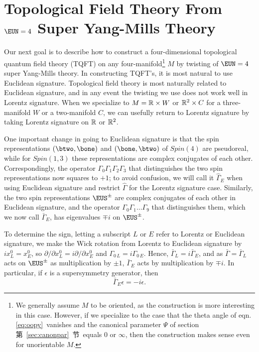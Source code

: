 
\section{Topological Field Theory From ${\EUN}=4$ Super
Yang-Mills Theory} \label{sec:tqftfour}

Our next goal is to describe how to construct a four-dimensional
topological quantum field theory (TQFT) on any
four-manifold\footnote{We generally assume $M$ to be oriented, as the
construction is more interesting in this case.  However, if we
specialize to the case that the theta angle of eqn. \eqref{eq:oopy}\
vanishes and the canonical parameter $\Psi$ of section 第~\ref{sec:canonpar}~节\
equals 0 or $\infty$, then the construction makes sense even for
unorientable $M$.} $M$ by twisting of ${\EUN}=4$ super Yang-Mills
theory. In constructing TQFT's, it is most natural to use
Euclidean signature. Topological field theory is most naturally
related to Euclidean signature, and in any event the twisting we
use does not work well in Lorentz signature. When we specialize to
$M=\Bbb{R}\times W$ or $\Bbb{R}^2\times C$ for a three-manifold
$W$ or a two-manifold $C$, we can usefully return to Lorentz
signature by taking Lorentz signature on $\Bbb{R}$ or $\Bbb{R}^2$.

One important change in going to Euclidean signature is that the
spin representations $(\btwo,\bone)$ and $(\bone,\btwo)$ of
$Spin(4)$ are pseudoreal, while for $Spin(1,3)$ these
representations are complex conjugates of each other.
Correspondingly,
 the operator
$\Gamma_0\Gamma_1\Gamma_2\Gamma_3$ that distinguishes the two spin
representations now squares to $+1$; to avoid confusion, we will
call it $\hat\Gamma_E$ when using Euclidean signature and restrict
$\hat\Gamma$ for the Lorentz signature case.  Similarly, the two
spin representations ${\EUS}^\pm$ are complex conjugates of each
other in Euclidean signature, and the operator
$\Gamma_0\Gamma_1\dots\Gamma_9$ that distinguishes them, which we
now call $\bar\Gamma_E$, has eigenvalues $\mp i$ on ${\EUS}^\pm$.

To determine the sign, letting a subscript $L$ or $E$ refer to
Lorentz or Euclidean signature, we make the Wick rotation from
Lorentz to Euclidean signature by $ix^0_L=x^0_E$, so
$\partial/\partial x^0_L=i\partial/\partial x^0_E$ and
$\Gamma_{0\,L}=i\Gamma_{0\,E}$.  Hence, $\bar\Gamma_L =
i\bar\Gamma_E$, and as $\bar\Gamma=\bar\Gamma_L$ acts on
$\EUS^\pm$ as multiplication by $\pm 1$, $\bar\Gamma_E$ acts by
multiplication by $\mp i$.  In particular, if $\epsilon$ is a
supersymmetry generator, then
\setcounter{equation}{0}
\begin{equation}\label{eq:nohinks}
\bar\Gamma_E\epsilon=-i\epsilon.
\end{equation}
